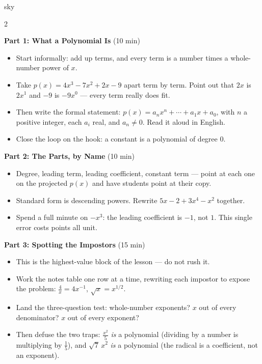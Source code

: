 \documentclass[10pt]{article}
\begin{document}
\begin{skillbox}[Lesson]{sky}
\begin{multicols}{2}

\textbf{Part 1: What a Polynomial Is} (10 min)

\begin{itemize}
  \item Start informally: add up terms, and every term is a number times a
        whole-number power of $x$.
  \item Take $p(x) = 4x^3 - 7x^2 + 2x - 9$ apart term by term. Point out that
        $2x$ is $2x^1$ and $-9$ is $-9x^0$ --- every term really does fit.
  \item Then write the formal statement:
        $p(x) = a_n x^n + \cdots + a_1x + a_0$, with $n$ a positive integer,
        each $a_i$ real, and $a_n \ne 0$. Read it aloud in English.
  \item Close the loop on the hook: a constant is a polynomial of degree 0.
\end{itemize}

\textbf{Part 2: The Parts, by Name} (10 min)

\begin{itemize}
  \item Degree, leading term, leading coefficient, constant term --- point at each
        one on the projected $p(x)$ and have students point at their copy.
  \item Standard form is descending powers. Rewrite $5x - 2 + 3x^4 - x^2$ together.
  \item Spend a full minute on $-x^3$: the leading coefficient is $-1$, not $1$.
        This single error costs points all unit.
\end{itemize}

\columnbreak

\textbf{Part 3: Spotting the Impostors} (15 min)

\begin{itemize}
  \item This is the highest-value block of the lesson --- do not rush it.
  \item Work the notes table one row at a time, rewriting each impostor to expose
        the problem: $\frac{4}{x} = 4x^{-1}$, $\sqrt{x} = x^{1/2}$.
  \item Land the three-question test: whole-number exponents? $x$ out of every
        denominator? $x$ out of every exponent?
  \item Then defuse the two traps: $\frac{x^2}{5}$ \textit{is} a polynomial
        (dividing by a number is multiplying by $\frac{1}{5}$), and $\sqrt{7}\,x^2$
        \textit{is} a polynomial (the radical is a coefficient, not an exponent).
\end{itemize}


\end{multicols}
\end{skillbox}
\end{document}
